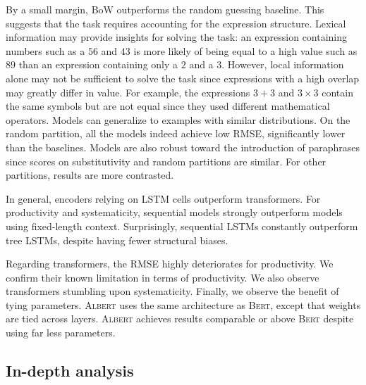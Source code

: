 By a small margin, BoW outperforms the random guessing baseline. This suggests that the task requires accounting for the expression structure. Lexical information may provide insights for solving the task: an expression containing numbers such as a $56$ and $43$ is more likely of being equal to a high value such as $89$ than an expression containing only a $2$ and a $3$. However, local information alone may not be sufficient to solve the task since expressions with a high overlap may greatly differ in value. For example, the expressions $3+3$ and $3\times3$ contain the same symbols but are not equal since they used different mathematical operators. 
Models can generalize to examples with similar distributions. On the random partition, all the models indeed achieve low RMSE, significantly lower than the baselines. Models are also robust toward the introduction of paraphrases since scores on substitutivity and random partitions are similar. For other partitions, results are more contrasted.

In general, encoders relying on LSTM cells outperform transformers. For productivity and systematicity, sequential models strongly outperform models using fixed-length context. Surprisingly, sequential LSTMs constantly outperform tree LSTMs, despite having fewer structural biases.

Regarding transformers, the RMSE highly deteriorates for productivity. We confirm their known limitation in terms of productivity. We also observe transformers stumbling upon systematicity. Finally, we observe the benefit of tying parameters. \textsc{Albert} uses the same architecture as \textsc{Bert}, except that weights are tied across layers. \textsc{Albert} achieves results comparable or above \textsc{Bert} despite using far less parameters.

\subsection{In-depth analysis} 


